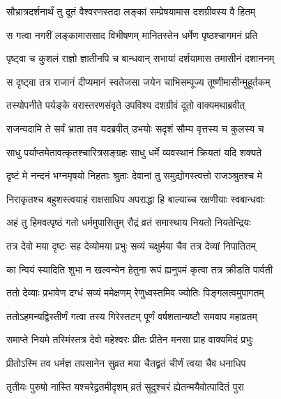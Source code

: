 \twolineshloka
{सौभ्रात्रदर्शनार्थं तु दूतं वैश्वरणस्तदा}
{लङ्कां सम्प्रेषयामास दशग्रीवस्य वै हितम्} %

\twolineshloka
{स गत्वा नगरीं लङ्कामाससाद विभीषणम्}
{मानितस्तेन धर्मेण पृष्ठश्चागमनं प्रति} %

\twolineshloka
{पृष्ट्वा च कुशलं राज्ञो ज्ञातीनपि च बान्धवान्}
{सभायां दर्शयामास तमासीनं दशाननम्} %

\twolineshloka
{स दृष्ट्वा तत्र राजानं दीप्यमानं स्वतेजसा}
{जयेन चाभिसम्पूज्य तूष्णीमासीन्मुहूर्तकम्} %

\twolineshloka
{तस्योपनीते पर्यङ्के वरास्तरणसंवृते}
{उपविश्य दशग्रीवं दूतो वाक्यमथाब्रवीत्} %

\twolineshloka
{राजन्वदामि ते सर्वं भ्राता तव यदब्रवीत्}
{उभयोः सदृशं सौम्य वृत्तस्य च कुलस्य च} %

\twolineshloka
{साधु पर्याप्तमेतावत्कृतश्चारित्रसङ्ग्रहः}
{साधु धर्मे व्यवस्थानं क्रियतां यदि शक्यते} %

\twolineshloka
{दृष्टं मे नन्दनं भग्नमृषयो निहताः श्रुताः}
{देवानां तु समुद्योगस्त्वत्तो राजञ्श्रुतश्च मे} %

\twolineshloka
{निराकृतश्च बहुशस्त्वयाहं राक्षसाधिप}
{अपराद्धा हि बाल्याच्च रक्षणीयाः स्वबान्धवाः} %

\twolineshloka
{अहं तु हिमवत्पृष्ठं गतो धर्ममुपासितुम्}
{रौद्रं व्रतं समास्थाय नियतो नियतेन्द्रियः} %

\twolineshloka
{तत्र देवो मया दृष्टः सह देव्योमया प्रभुः}
{सव्यं चक्षुर्मया चैव तत्र देव्यां निपातितम्} %

\twolineshloka
{का न्वियं स्यादिति शुभा न खल्वन्येन हेतुना}
{रूपं ह्यनुपमं कृत्वा तत्र क्रीडति पार्वती} %

\twolineshloka
{ततो देव्याः प्रभावेण दग्धं सव्यं ममेक्षणम्}
{रेणुध्वस्तमिव ज्योतिः पिङ्गलत्वमुपागतम्} %

\twolineshloka
{ततोऽहमन्यद्विस्तीर्णं गत्वा तस्य गिरेस्तटम्}
{पूर्णं वर्षशतान्यष्टौ समवाप महाव्रतम्} %

\twolineshloka
{समाप्ते नियमे तस्मिंस्तत्र देवो महेश्वरः}
{प्रीतः प्रीतेन मनसा प्राह वाक्यमिदं प्रभुः} %

\twolineshloka
{प्रीतोऽस्मि तव धर्मज्ञ तपसानेन सुव्रत}
{मया चैतद्व्रतं चीर्णं त्वया चैव धनाधिप} %

\twolineshloka
{तृतीयः पुरुषो नास्ति यश्चरेद्व्रतमीदृशम्}
{व्रतं सुदुश्चरं ह्येतन्मयैवोत्पादितं पुरा} %

